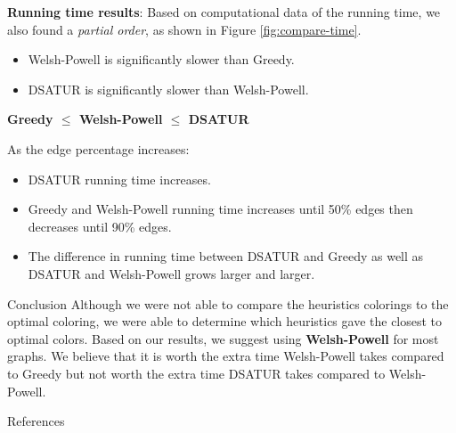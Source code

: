 \documentclass[final]{beamer}
\newlength{\onecolwid}
\begin{document}
\begin{frame}[t]
\begin{columns}[t]
\begin{column}{\onecolwid}
    \textbf{Running time results}: \newline
    Based on computational data of the running time, we also found a \emph{partial order}, as shown in Figure \ref{fig:compare-time}.
    \begin{itemize}
      \item Welsh-Powell is significantly slower than Greedy.
      \item DSATUR is significantly slower than Welsh-Powell.
    \end{itemize}
    \begin{center}
      \textbf{Greedy $\leq$ Welsh-Powell $\leq$ DSATUR}
    \end{center}
    As the edge percentage increases:
    \begin{itemize}
      \item DSATUR running time increases.
      \item Greedy and Welsh-Powell running time increases until 50\% edges then decreases until 90\% edges.
      \item The difference in running time between DSATUR and Greedy as well as DSATUR and Welsh-Powell grows larger and larger.
    \end{itemize}


    \begin{block}{Conclusion}
      Although we were not able to compare the heuristics colorings to the optimal coloring, we were able to determine which heuristics gave the closest to optimal colors. Based on our results, we suggest using \textbf{Welsh-Powell} for most graphs. We believe that it is worth the extra time Welsh-Powell takes compared to Greedy but not worth the extra time DSATUR takes compared to Welsh-Powell.
    \end{block}

    \begin{block}{References}
      \small{}
    \end{block}


\end{column}
\end{columns}
\end{frame}
\end{document}

